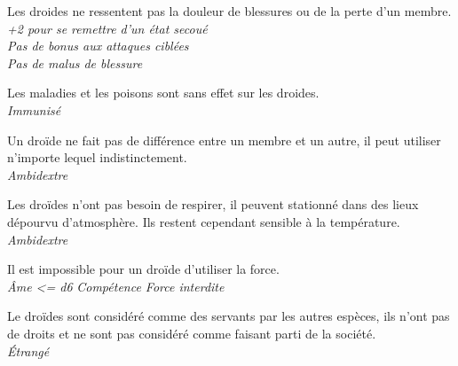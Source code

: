 \begin{description}[align=left]
\item [Créature artificielle] 	%
		Les droides ne ressentent pas la douleur de blessures ou de la perte d'un membre.\\
		\emph{+2 pour se remettre d'un état secoué}\\
		\emph{Pas de bonus aux attaques ciblées}\\
		\emph{Pas de malus de blessure}
\item [Immunisé] 				%
		Les maladies et les poisons sont sans effet sur les droides.\\
		\emph{Immunisé}
\item [Ambidextre] 				%
		Un droïde ne fait pas de différence entre un membre et un autre, il peut utiliser n'importe lequel indistinctement.\\
		\emph{Ambidextre}
\item [Manque pas d'air] 		%
		Les droïdes n'ont pas besoin de respirer, il peuvent stationné dans des lieux dépourvu d'atmosphère. Ils restent cependant sensible à la température.\\
		\emph{Ambidextre}
\item [Pas d'\^Ame] 			%
		Il est impossible pour un droïde d'utiliser la force.\\
		\emph{\^Ame <= d6}
		\emph{Compétence Force interdite}
\item [Outsider] 				%
		Le droïdes sont considéré comme des servants par les autres espèces, ils n'ont pas de droits et ne sont pas considéré comme faisant parti de la société.\\
		\emph{\'Etrangé}
\end{description}